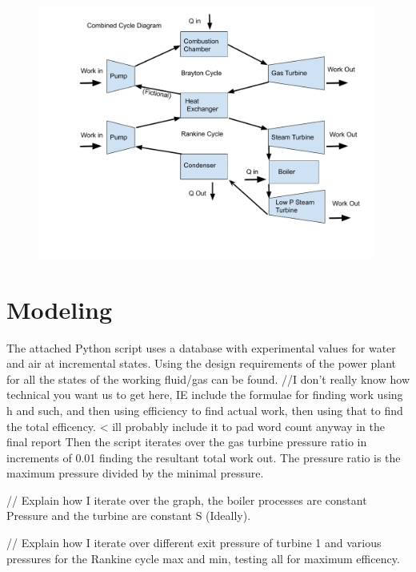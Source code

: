\documentclass{article}
\begin{document}
\begin{figure}[!htbp]
\centering
  \includegraphics[page=1,trim=10mm 0mm 10mm 0mm,clip,width=0.99\textwidth]{Figures/Copy of Combined Cycle Diagram.pdf}
  \caption{}
  \label{fig:epsfig}
\end{figure}

\FloatBarrier

\section{Modeling}

The attached Python script uses a database with experimental values for water and air at incremental states. Using the design requirements of the power plant for all the states of the working fluid/gas can be found. //I don't really know how technical you want us to get here, IE include the formulae for finding work using h and such, and then using efficiency to find actual work, then using that to find the total efficency. < ill probably include it to pad word count anyway in the final report
Then the script iterates over the gas turbine pressure ratio in increments of 0.01 finding the resultant total work out. The pressure ratio is the maximum pressure divided by the minimal pressure. 

// Explain how I iterate over the graph, the boiler processes are constant Pressure and the turbine are constant S (Ideally).

// Explain how I iterate over different exit pressure of turbine 1 and various pressures for the Rankine cycle max and min, testing all for maximum efficency.
\end{document}
